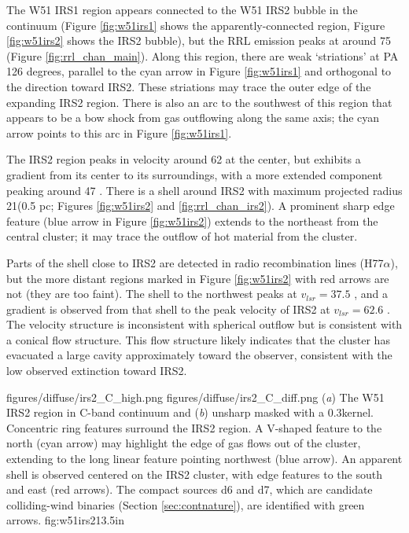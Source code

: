 The W51 IRS1 \hii region appears connected to the W51 IRS2
bubble in the continuum (Figure \ref{fig:w51irs1} shows the
apparently-connected region, Figure \ref{fig:w51irs2} shows the IRS2 bubble),
but the RRL emission peaks at around 75 \kms (Figure \ref{fig:rrl_chan_main}).
Along this
region, there are weak `striations' at PA 126 degrees, parallel to the cyan
arrow in Figure \ref{fig:w51irs1} and orthogonal to the direction toward
IRS2.  These striations  may trace the outer edge of the expanding IRS2
region.  There is also an arc to the southwest of this region that appears to
be a bow shock from gas outflowing along the same axis; the cyan arrow points
to this arc in Figure \ref{fig:w51irs1}.

The IRS2 region peaks in velocity around 62 \kms at the center, but exhibits a
gradient from its center to its surroundings, with a more extended component
peaking around 47 \kms.  There is a shell around IRS2 with maximum projected
radius 21\arcsec (0.5 pc; Figures \ref{fig:w51irs2} and
\ref{fig:rrl_chan_irs2}).  A prominent sharp edge feature (blue arrow in Figure
\ref{fig:w51irs2}) extends to the northeast from the central cluster; it may
trace the outflow of hot material from the cluster.

Parts of the shell close to IRS2 are detected in radio recombination lines
(H77$\alpha$), but the more distant regions marked in Figure \ref{fig:w51irs2}
with red arrows are not (they are too faint).  The shell to the northwest peaks
at $v_{lsr}=37.5$ \kms, and a gradient is observed from that shell to the peak
velocity of IRS2 at $v_{lsr} = 62.6$ \kms.  The velocity structure is
inconsistent with spherical outflow but is consistent with a conical flow
structure.  This flow structure likely
indicates that the cluster has evacuated a large cavity approximately toward
the observer, consistent with the low observed extinction toward
IRS2.  

\FigureTwo
{figures/diffuse/irs2_C_high.png}
{figures/diffuse/irs2_C_diff.png}
{(\textit{a}) The W51 IRS2 region in C-band continuum and (\textit{b}) unsharp
masked with a 0.3\arcsec kernel.  Concentric ring features surround the IRS2
region.  A V-shaped feature to the north (cyan arrow) may highlight the edge of
gas flows out of the cluster, extending to the long linear feature pointing
northwest (blue arrow).  An
apparent shell is observed centered on the IRS2 cluster, with edge
features to the south and east (red arrows).  The compact sources d6 and d7,
which are candidate colliding-wind binaries (Section \ref{sec:contnature}),
are identified with green arrows.
}
{fig:w51irs2}{1}{3.5in}

